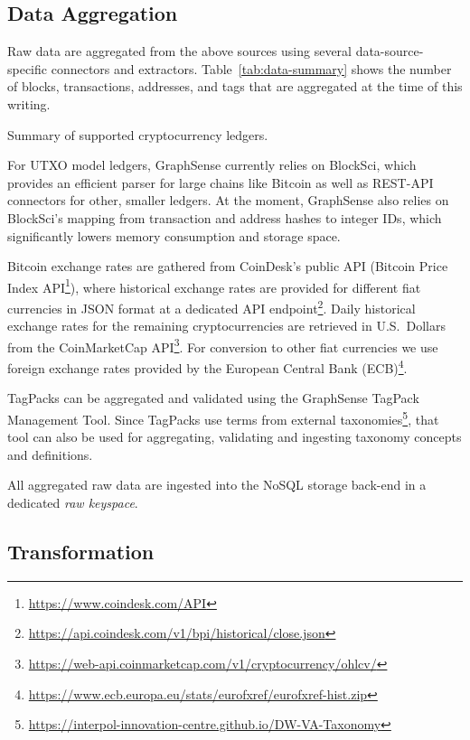\subsection{Data Aggregation}

Raw data are aggregated from the above sources using several
data-source-specific connectors and extractors. Table~\ref{tab:data-summary} shows the number of blocks, transactions, addresses, and tags that are aggregated at the time of this writing.

\begin{table}[h]
  \centering%
  \caption{Summary of supported cryptocurrency ledgers.}%
  \label{tab:data-summary}%
\end{table}

For UTXO model ledgers, GraphSense currently relies on BlockSci, which provides an efficient parser for large chains like Bitcoin as well as REST-API connectors for other, smaller ledgers. At the moment, GraphSense also relies on BlockSci's mapping from transaction and address hashes to integer IDs, which significantly lowers memory consumption and storage space.

Bitcoin exchange rates are gathered from CoinDesk's public API (Bitcoin Price Index API\footnote{\url{https://www.coindesk.com/API}}), where historical exchange rates are provided for different fiat currencies in JSON format at a dedicated API endpoint\footnote{\url{https://api.coindesk.com/v1/bpi/historical/close.json}}. Daily historical exchange rates for the remaining cryptocurrencies are retrieved in U.S.\ Dollars from the CoinMarketCap API\footnote{\url{https://web-api.coinmarketcap.com/v1/cryptocurrency/ohlcv/}}. For conversion to other fiat currencies we use foreign exchange rates provided by the European Central Bank (ECB)\footnote{\url{https://www.ecb.europa.eu/stats/eurofxref/eurofxref-hist.zip}}.

TagPacks can be aggregated and validated using the GraphSense TagPack Management Tool. Since TagPacks use terms from external taxonomies\footnote{\url{https://interpol-innovation-centre.github.io/DW-VA-Taxonomy}}, that tool can also be used for aggregating, validating and ingesting taxonomy concepts and definitions.

All aggregated raw data are ingested into the NoSQL storage back-end in a dedicated \emph{raw keyspace}.

\subsection{Transformation}

